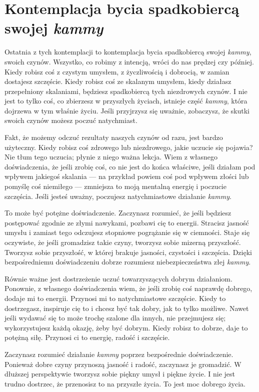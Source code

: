 \documentclass[12pt,openany]{book}
\begin{document}
\section*{Kontemplacja bycia spadkobiercą swojej \textit{kammy}}

Ostatnia z tych kontemplacji to kontemplacja bycia spadkobiercą swojej \textit{kammy}, swoich czynów. Wszystko, co robimy z intencją, wróci do nas prędzej czy później. Kiedy robisz coś z czystym umysłem, z życzliwością i dobrocią, w zamian dostajesz szczęście. Kiedy robisz coś ze skalanym umysłem, kiedy działasz przepełniony skalaniami, będziesz spadkobiercą tych niezdrowych czynów. I nie jest to tylko coś, co zbierzesz w przyszłych życiach, istnieje część \textit{kammy}, która dojrzewa w tym właśnie życiu. Jeśli przyjrzysz się uważnie, zobaczysz, że skutki swoich czynów możesz poczuć natychmiast.

Fakt, że możemy odczuć rezultaty naszych czynów od razu, jest bardzo użyteczny. Kiedy robisz coś zdrowego lub niezdrowego, jakie uczucie się pojawia? Nie tłum tego uczucia; płynie z niego ważna lekcja. Wiem z własnego doświadczenia, że jeśli zrobię coś, co nie jest do końca właściwe, jeśli działam pod wpływem jakiegoś skalania --- na przykład powiem coś pod wpływem złości lub pomyślę coś niemiłego --- zmniejsza to moją mentalną energię i poczucie szczęścia. Jeśli jesteś uważny, poczujesz natychmiastowe działanie \textit{kammy}.

To może być potężne doświadczenie. Zaczynasz rozumieć, że jeśli będziesz postępować zgodnie ze złymi nawykami, pozbawi cię to energii. Stracisz jasność umysłu i zamiast tego odczujesz stopniowe pogrążanie się w ciemności. Staje się oczywiste, że jeśli gromadzisz takie czyny, tworzysz sobie mizerną przyszłość. Tworzysz sobie przyszłość, w której brakuje jasności, czystości i szczęścia. Dzięki bezpośredniemu doświadczeniu dobrze rozumiesz niebezpieczeństwa złej \textit{kammy}.

Równie ważne jest dostrzeżenie uczuć towarzyszących dobrym działaniom. Ponownie, z własnego doświadczenia wiem, że jeśli zrobię coś naprawdę dobrego, dodaje mi to energii. Przynosi mi to natychmiastowe szczęście.  Kiedy to dostrzegasz, inspiruje cię to i chcesz być tak dobry, jak to tylko możliwe. Nawet jeśli wydawać się to może trochę szalone dla innych, nie przejmujesz się; wykorzystujesz każdą okazję, żeby być dobrym. Kiedy robisz to dobrze, daje to potężną siłę. Przynosi ci to energię, radość i szczęście.

Zaczynasz rozumieć działanie \textit{kammy} poprzez bezpośrednie doświadczenie. Ponieważ dobre czyny przynoszą jasność i radość, zaczynasz je gromadzić. W dłuższej perspektywie tworzysz sobie piękny umysł i piękne życie. I nie jest trudno dostrzec, że przenosisz to na przyszłe życia. To jest moc dobrego życia.
\end{document}
